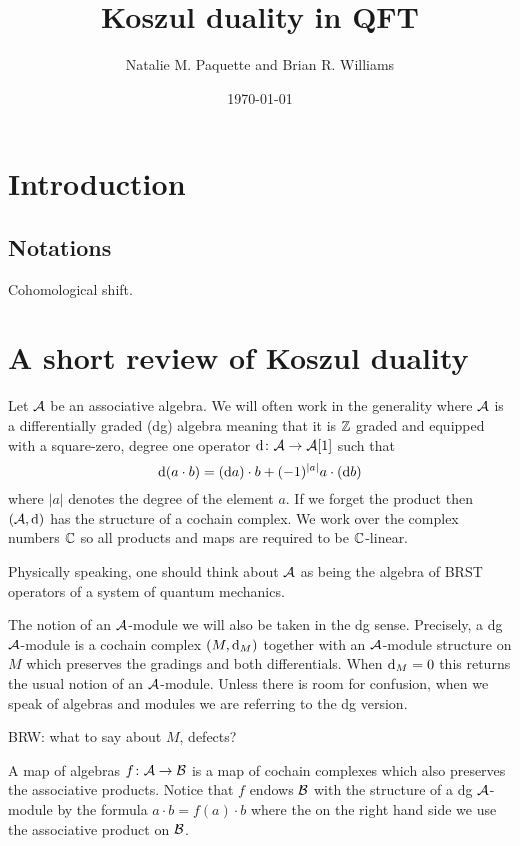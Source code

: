 \documentclass[11pt]{amsart}
\author{Natalie M. Paquette and Brian R. Williams}
\date{\today}
\title{Koszul duality in QFT}
\def\brian#1{{\textcolor{blue!65!red}{BRW: {#1}}}}
\begin{document}
\maketitle



\section{Introduction}

\subsection*{Notations}

Cohomological shift. 



\section{A short review of Koszul duality} 


Let $\mathcal A$ be an associative algebra.
We will often work in the generality where $\mathcal A$ is a differentially graded (dg) algebra meaning that it is $\mathbb Z$ graded and equipped with a square-zero, degree one operator ${\rm d} \colon \mathcal A \to \mathcal A[1]$ such that 
\[
{\rm d} (a \cdot b) = ({\rm d} a) \cdot b + (-1)^{|a|} a \cdot ({\rm d} b) 
\]
where $|a|$ denotes the degree of the element $a$. 
If we forget the product then $(\mathcal A, {\rm d})$ has the structure of a cochain complex. 
We work over the complex numbers $\mathbb C$ so all products and maps are required to be $\mathbb C$-linear. 

Physically speaking, one should think about $\mathcal A$ as being the algebra of BRST operators of a system of quantum mechanics.

The notion of an $\mathcal A$-module we will also be taken in the dg sense. 
Precisely, a dg $\mathcal A$-module is a cochain complex $(M, {\rm d}_M)$ together with an $\mathcal A$-module structure on $M$ which preserves the gradings and both differentials. 
When ${\rm d}_M = 0$ this returns the usual notion of an $\mathcal A$-module. 
Unless there is room for confusion, when we speak of algebras and modules we are referring to the dg version.

\brian{what to say about $M$, defects?}
 
A map of algebras $f \colon \mathcal A \to \mathcal B$ is a map of cochain complexes which also preserves the associative products.
Notice that $f$ endows $\mathcal B$ with the structure of a dg $\mathcal A$-module by the formula $a \cdot b = f(a) \cdot b$ where the on the right hand side we use the associative product on $\mathcal B$.  
\end{document}
